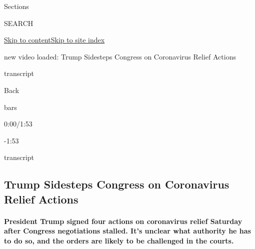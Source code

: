 Sections

SEARCH

\protect\hyperlink{site-content}{Skip to
content}\protect\hyperlink{site-index}{Skip to site index}

new video loaded: Trump Sidesteps Congress on Coronavirus Relief Actions

transcript

Back

bars

0:00/1:53

-1:53

transcript

\hypertarget{trump-sidesteps-congress-on-coronavirus-relief-actions}{%
\subsection{Trump Sidesteps Congress on Coronavirus Relief
Actions}\label{trump-sidesteps-congress-on-coronavirus-relief-actions}}

\hypertarget{president-trump-signed-four-actions-on-coronavirus-relief-saturday-after-congress-negotiations-stalled-its-unclear-what-authority-he-has-to-do-so-and-the-orders-are-likely-to-be-challenged-in-the-courts}{%
\paragraph{President Trump signed four actions on coronavirus relief
Saturday after Congress negotiations stalled. It's unclear what
authority he has to do so, and the orders are likely to be challenged in
the
courts.}\label{president-trump-signed-four-actions-on-coronavirus-relief-saturday-after-congress-negotiations-stalled-its-unclear-what-authority-he-has-to-do-so-and-the-orders-are-likely-to-be-challenged-in-the-courts}}

